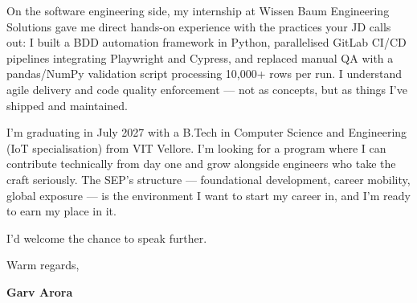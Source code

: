 \documentclass[letterpaper, 11pt]{article}
\begin{document}
\vspace{6pt}
\noindent
On the software engineering side, my internship at Wissen Baum Engineering Solutions
gave me direct hands-on experience with the practices your JD calls out:
I built a BDD automation framework in Python, parallelised GitLab CI/CD pipelines
integrating Playwright and Cypress, and replaced manual QA with a pandas/NumPy
validation script processing 10,000+ rows per run.
I understand agile delivery and code quality enforcement --- not as concepts,
but as things I've shipped and maintained.

\vspace{6pt}
\noindent
I'm graduating in July 2027 with a B.Tech in Computer Science and Engineering
(IoT specialisation) from VIT Vellore.
I'm looking for a program where I can contribute technically from day one and grow
alongside engineers who take the craft seriously.
The SEP's structure --- foundational development, career mobility, global exposure ---
is the environment I want to start my career in, and I'm ready to earn my place in it.

\vspace{6pt}
\noindent
I'd welcome the chance to speak further.

\vspace{14pt}
\noindent Warm regards,

\vspace{10pt}
\noindent \textbf{Garv Arora}
\end{document}
